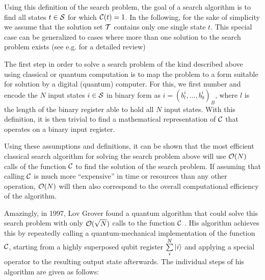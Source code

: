 \smallskip

Using this definition of the search problem, the goal of a search algorithm is to find all states $t\in\begin{mathcal}S\end{mathcal}$ for which $\Or(t) = 1$. In the following, for the sake of simplicity we assume that the solution set $\begin{mathcal}T\end{mathcal}$ contains only one single state $t$. This special case can be generalized to cases where more than one solution to the search problem exists (see e.g. \cite{nielsen_quantum_2000,mermin_quantum_2007} for a detailed review)

\smallskip

The first step in order to solve a search problem of the kind described above using classical or quantum computation is to map the problem to a form suitable for solution by a digital (quantum) computer. For this, we first number and encode the $N$ input states $i \in \begin{mathcal}S\end{mathcal}$ in binary form as $i=(b^i_l,\hdots,b^i_0)_B$, where $l$ is the length of the binary register able to hold all $N$ input states. With this definition, it is then trivial to find a mathematical representation of $\Or$ that operates on a binary input register. 

\smallskip

Using these assumptions and definitions, it can be shown that the most efficient classical search algorithm for solving the search problem above will use $\begin{mathcal}O\end{mathcal}(N)$ calls of the function $\Or$ to find the solution of the search problem. If assuming that calling $\Or$ is much more ``expensive'' in time or resources than any other operation, $\begin{mathcal}O\end{mathcal}(N)$ will then also correspond to the overall computational efficiency of the algorithm.

\smallskip

Amazingly, in 1997, Lov Grover found a quantum algorithm that could solve this search problem with only $\begin{mathcal}O\end{mathcal}(\sqrt{N})$ calls to the function $\Or$ \citep{Grover_Quantum_1997}. His algorithm achieves this by repeatedly calling a quantum-mechanical implementation of the function $\Or$, starting from a highly superposed qubit register $\sum\limits_i^N \left| i \right>$ and applying a special operator to the resulting output state afterwards. The individual steps of his algorithm are given as follows:

